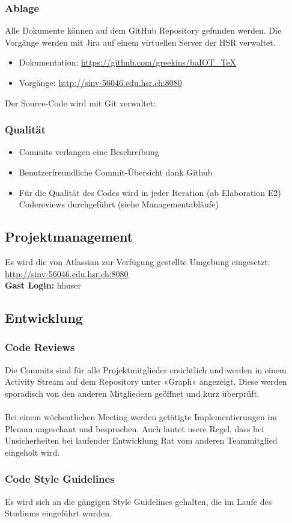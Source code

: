 \subsubsection*{Ablage}
Alle Dokumente können auf dem GitHub Repository gefunden werden. Die Vorgänge werden mit Jira auf einem virtuellen Server der HSR verwaltet.
\begin{itemize}
	\item Dokumentation: \url{https://github.com/greekins/baIOT_TeX} 
	\item Vorgänge: \url{http://sinv-56046.edu.hsr.ch:8080}
\end{itemize}
Der Source-Code wird mit Git verwaltet: \tbd

\subsubsection*{Qualität}
\begin{itemize}
	\item Commits verlangen eine Beschreibung
	\item Benutzerfreundliche Commit-Übersicht dank Github
	\item Für die Qualität des Codes wird in jeder Iteration (ab Elaboration E2) Codereviews durchgeführt (siehe Managementabläufe)
\end{itemize}

\subsection*{Projektmanagement}
Es wird die von Atlassian zur Verfügung gestellte Umgebung eingesetzt: \\
\url{http://sinv-56046.edu.hsr.ch:8080} \\
\textbf{Gast Login:} hhuser


\subsection*{Entwicklung}
\subsubsection*{Code Reviews}
Die Commits sind für alle Projektmitglieder ersichtlich und werden in einem Activity Stream auf dem Repository unter «Graph» angezeigt. Diese werden sporadisch von den anderen Mitgliedern geöffnet und kurz überprüft. \\
\\
Bei einem wöchentlichen Meeting werden getätigte Implementierungen im Plenum angeschaut und besprochen. Auch lautet usere Regel, dass bei Unsicherheiten bei laufender Entwicklung Rat vom anderen Teammitglied eingeholt wird.

\subsubsection*{Code Style Guidelines}
Es wird sich an die gängigen Style Guidelines gehalten, die im Laufe des Studiums eingeführt wurden.